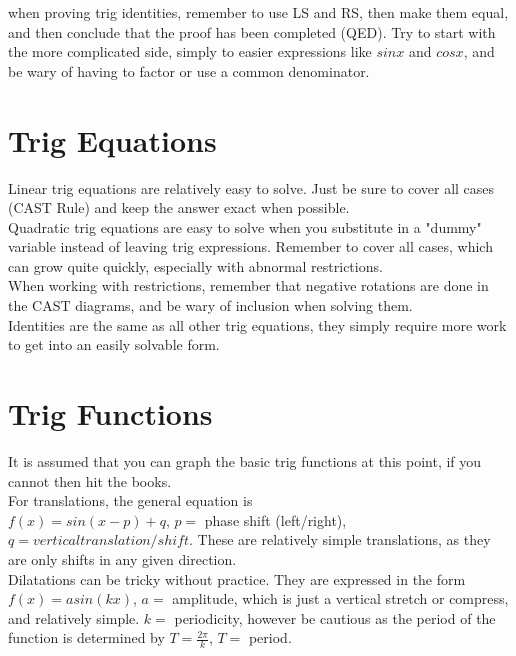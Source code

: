 \documentclass{article}
\begin{document}
when proving trig identities, remember to use LS and RS, then make them equal, and then conclude that the proof has been completed (QED). Try to start with the more complicated side, simply to easier expressions like $sinx$ and $cosx$, and be wary of having to factor or use a common denominator. 

\section{Trig Equations}

Linear trig equations are relatively easy to solve. Just be sure to cover all cases (CAST Rule) and keep the answer exact when possible. \\

Quadratic trig equations are easy to solve when you substitute in a "dummy" variable instead of leaving trig expressions. Remember to cover all cases, which can grow quite quickly, especially with abnormal restrictions. \\

When working with restrictions, remember that negative rotations are done in the CAST diagrams, and be wary of inclusion when solving them. \\

Identities are the same as all other trig equations, they simply require more work to get into an easily solvable form. \\

\section{Trig Functions}

It is assumed that you can graph the basic trig functions at this point, if you cannot then hit the books. \\

For translations, the general equation is \\

$f(x)=sin(x-p) +q$, $p = $ phase shift (left/right), $q = vertical translation/shift$. These are relatively simple translations, as they are only shifts in any given direction. \\

Dilatations can be tricky without practice. They are expressed in the form \\

$f(x)=asin(kx)$, $a =$ amplitude, which is just a vertical stretch or compress, and relatively simple. $k =$ periodicity, however be cautious as the period of the function is determined by $T = \frac{2\pi}{k}$, $T =$ period. \\
\end{document}

